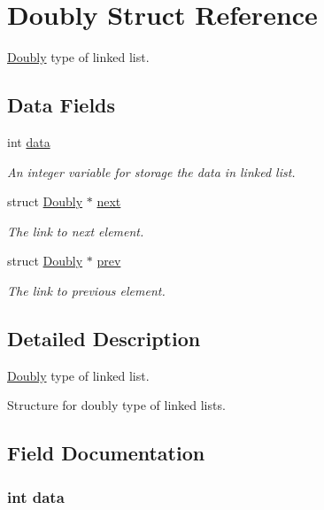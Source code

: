 \hypertarget{struct_doubly}{}\section{Doubly Struct Reference}
\label{struct_doubly}


\hyperlink{struct_doubly}{Doubly} type of linked list.  


\subsection*{Data Fields}
\begin{DoxyCompactItemize}
\item 
int \hyperlink{struct_doubly_a9eab91667db4d35c7231dcddf7b89a76}{data}
\begin{DoxyCompactList}\small\item\em An integer variable for storage the data in linked list. \end{DoxyCompactList}\item 
struct \hyperlink{struct_doubly}{Doubly} $\ast$ \hyperlink{struct_doubly_a446016a5717359a5bb6fd48bd6074689}{next}
\begin{DoxyCompactList}\small\item\em The link to next element. \end{DoxyCompactList}\item 
struct \hyperlink{struct_doubly}{Doubly} $\ast$ \hyperlink{struct_doubly_a64610e02fbdabdc7e7765ec91baaab18}{prev}
\begin{DoxyCompactList}\small\item\em The link to previous element. \end{DoxyCompactList}\end{DoxyCompactItemize}


\subsection{Detailed Description}
\hyperlink{struct_doubly}{Doubly} type of linked list. 

Structure for doubly type of linked lists. 

\subsection{Field Documentation}
\subsubsection[{\texorpdfstring{data}{data}}]{\setlength{\rightskip}{0pt plus 5cm}int data}\hypertarget{struct_doubly_a9eab91667db4d35c7231dcddf7b89a76}{}\label{struct_doubly_a9eab91667db4d35c7231dcddf7b89a76}



